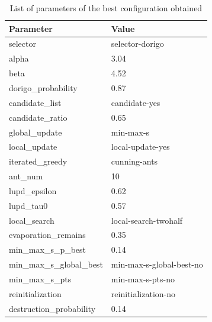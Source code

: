 \documentclass[11pt,a4paper,oneside]{book}
\begin{document}
\begin{table}[]
\centering
\caption{List of parameters of the best configuration obtained}
\label{tbl:obtained}
\begin{tabular}{|l|l|}
\hline
\textbf{Parameter}       & \textbf{Value}         \\ \hline
selector                 & selector-dorigo        \\ \hline
alpha                    & 3.04                   \\ \hline
beta                     & 4.52                   \\ \hline
dorigo\_probability      & 0.87                   \\ \hline
candidate\_list          & candidate-yes          \\ \hline
candidate\_ratio         & 0.65                   \\ \hline
global\_update           & min-max-s              \\ \hline
local\_update            & local-update-yes       \\ \hline
iterated\_greedy         & cunning-ants           \\ \hline
ant\_num                 & 10                     \\ \hline
lupd\_epsilon            & 0.62                   \\ \hline
lupd\_tau0               & 0.57                   \\ \hline
local\_search            & local-search-twohalf   \\ \hline
evaporation\_remains     & 0.35                   \\ \hline
min\_max\_s\_p\_best     & 0.14                   \\ \hline
min\_max\_s\_global\_best & min-max-s-global-best-no  \\ \hline
min\_max\_s\_pts         & min-max-s-pts-no       \\ \hline
reinitialization         & reinitialization-no    \\ \hline
destruction\_probability & 0.14                   \\ \hline
\end{tabular}
\end{table}
\end{document}
